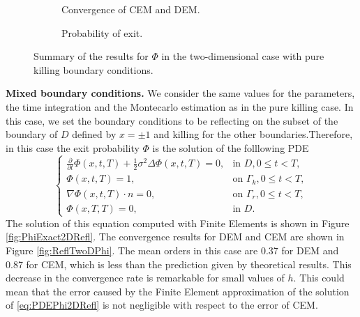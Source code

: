 \begin{figure}[t]
    \centering
    \begin{subfigure}{0.49\linewidth}
        \centering
        \resizebox{1\linewidth}{!}{ }  
        \caption{Convergence of CEM and DEM.}
        \label{fig:KillTwoDPhi}
    \end{subfigure}
    \begin{subfigure}{0.49\linewidth}
        \centering
        \resizebox{1\linewidth}{!}{ }  
        \caption{Probability of exit.}
        \label{fig:PhiExact2DKill}
    \end{subfigure}    
    \caption{Summary of the results for $\Phi$ in the two-dimensional case with pure killing boundary conditions.}
    \label{fig:OrdersTwoDKillPhi}
\end{figure}
\vspace{2mm}
\noindent\textbf{Mixed boundary conditions.} We consider the same values for the parameters, the time integration and the Montecarlo estimation as in the pure killing case. In this case, we set the boundary conditions to be reflecting on the subset of the boundary of $D$ defined by $x = \pm 1$ and killing for the other boundaries.Therefore, in this case the exit probability $\Phi$ is the solution of the folllowing PDE
\begin{equation}\label{eq:PDEPhi2DRefl}
\begin{cases}
	\frac{\partial}{\partial t} \Phi(x,t,T) + \frac{1}{2} \sigma^2 \Delta \Phi(x,t,T) = 0, & \text{in } D, 0 \leq t < T,\\
	\Phi(x,t,T) = 1, & \text{on } \Gamma_k, 0 \leq t < T,\\
	\nabla \Phi(x,t,T) \cdot n = 0, & \text{on } \Gamma_r, 0 \leq t < T,\\
	\Phi(x,T,T) = 0, & \text{in } D.
\end{cases}
\end{equation}
The solution of this equation computed with Finite Elements is shown in Figure \ref{fig:PhiExact2DRefl}. The convergence results for DEM and CEM are shown in Figure \ref{fig:ReflTwoDPhi}. The mean orders in this case are 0.37 for DEM and 0.87 for CEM, which is less than the prediction given by theoretical results. This decrease in the convergence rate is remarkable for small values of $h$. This could mean that the error caused by the Finite Element approximation of the solution of \eqref{eq:PDEPhi2DRefl} is not negligible with respect to the error of CEM.

